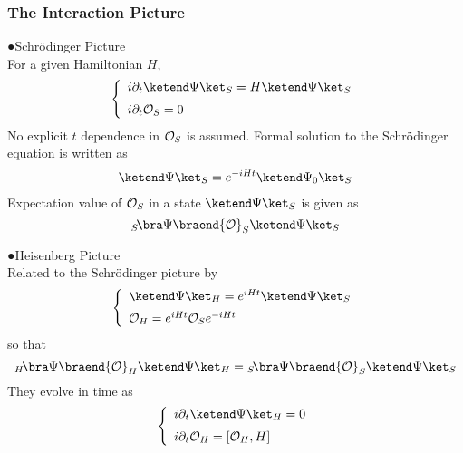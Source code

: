 \subsubsection{The Interaction Picture}
●Schr\"odinger Picture\\
For a given Hamiltonian $H$,
\begin{eqnarray}
\left\{
\begin{array}{l}
i \partial_t 
\ketend \Psi \ket_S
=
H \ketend \Psi \ket_S
\vspace{2mm}
\\
i \partial_t 
{\cal O}_S = 0
\end{array}
\right.
\end{eqnarray}
No explicit $t$ dependence in ${\cal O}_S$ is assumed.
Formal solution to the Schr\"odinger equation is written as
\begin{eqnarray}
\ketend \Psi \ket_S = e^{-iHt} \ketend \Psi_0 \ket_S
\label{eqn:SchrPicFormalSol}
\end{eqnarray}
Expectation value of ${\cal O}_S$ in a state $\ketend \Psi \ket_S$ is given as
\begin{equation}
{}_S\!\bra \Psi \braend {\cal O}_S \ketend \Psi \ket_S
\end{equation}

\bigskip

\noindent
●Heisenberg Picture\\
Related to the Schr\"odinger picture by
\begin{eqnarray}
\left\{
\begin{array}{l}
\ketend \Psi \ket_H
=
e^{iHt}
\ketend \Psi \ket_S
\vspace{2mm}
\\
{\cal O}_H = 
e^{iHt} {\cal O}_S e^{-iHt}
\end{array}
\right.
\end{eqnarray}
so that
\begin{equation}
{}_H\!\bra \Psi \braend {\cal O}_H \ketend \Psi \ket_H
=
{}_S\!\bra \Psi \braend {\cal O}_S \ketend \Psi \ket_S
\end{equation}
They evolve in time as
\begin{eqnarray}
\left\{
\begin{array}{l}
i \partial_t 
\ketend \Psi \ket_H
=
0
\vspace{2mm}
\\
i \partial_t 
{\cal O}_H = 
[ {\cal O}_H, H]
\end{array}
\right.
\end{eqnarray}

